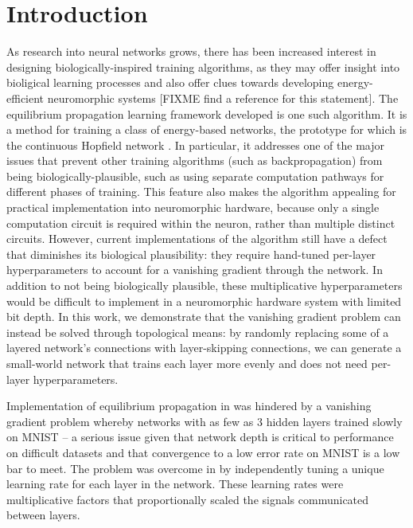 \documentclass[utf8]{frontiersSCNS}
\begin{document}
\section{Introduction}

As research into neural networks grows, there has been increased interest in designing biologically-inspired training algorithms, as they may offer insight into bioligical learning processes and also offer clues towards developing energy-efficient neuromorphic systems [FIXME find a reference for this statement].  The equilibrium propagation learning framework developed \cite{scellier17} is one such algorithm.  It is a method for training a class of energy-based networks, the prototype for which is the continuous Hopfield network \cite{hopfield1984}.  In particular, it addresses one of the major issues that prevent other training algorithms (such as backpropagation) from being biologically-plausible, such as using separate computation pathways for different phases of training. This feature also makes the algorithm appealing for practical implementation into neuromorphic hardware, because only a single computation circuit is required within the neuron, rather than multiple distinct circuits. However, current implementations of the algorithm still have a defect that diminishes its biological plausibility: they require hand-tuned per-layer hyperparameters to account for a vanishing gradient through the network. In addition to not being biologically plausible, these multiplicative hyperparameters would be difficult to implement in a neuromorphic hardware system with limited bit depth. In this work, we demonstrate that the vanishing gradient problem can instead be solved through topological means: by randomly replacing some of a layered network's connections with layer-skipping connections, we can generate a small-world network that trains each layer more evenly and does not need per-layer hyperparameters.


Implementation of equilibrium propagation in \citep{scellier17} was hindered by a vanishing gradient problem whereby networks with as few as 3 hidden layers trained slowly on MNIST \citep{mnist1998} -- a serious issue given that network depth is critical to performance on difficult datasets \citep{simonyan2014, srivastava2015tvdn} and that convergence to a low error rate on MNIST is a low bar to meet. The problem was overcome in \citep{scellier17} by independently tuning a unique learning rate for each layer in the network.  These learning rates were multiplicative factors that proportionally scaled the signals communicated between layers.
\end{document}
